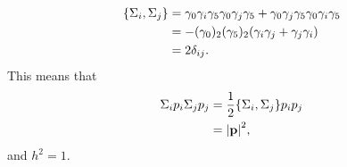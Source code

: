 \begin{align*}
	\acomm{\Sigma_{i}}{\Sigma_{j}} &= \gamma_{0}\gamma_{i}\gamma_{5}\gamma_{0}\gamma_{j}\gamma_{5} + \gamma_{0}\gamma_{j}\gamma_{5}\gamma_{0}\gamma_{i}\gamma_{5} \\
	                              &= -(\gamma_{0})_{2}(\gamma_{5})_{2}(\gamma_{i}\gamma_{j} + \gamma_{j}\gamma_{i}) \\
	                              &= 2\delta_{ij}.
\end{align*}
This means that
\begin{align*}
	\Sigma_{i}p_{i}\Sigma_{j}p_{j} &= \frac{1}{2}\acomm{\Sigma_{i}}{\Sigma_{j}}p_{i}p_{j} \\
	                               &= \abs{\vb{p}}^{2},
\end{align*}
and $h^{2} = 1$.

